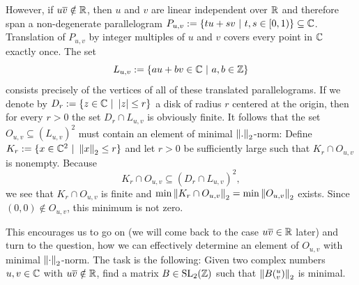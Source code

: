 However, if $u \overline{v} \notin \mathbb{R}$, then $u$ and $v$ are linear independent over $\mathbb{R}$ and therefore span a non-degenerate parallelogram $P_{u,v} := \{ t u + s v \ | \ t,s \in [0,1) \} \subseteq \mathbb{C}$. Translation of $P_{u,v}$ by integer multiples of $u$ and $v$ covers every point in $\mathbb{C}$ exactly once. The set
\begin{equation*}
L_{u,v} := \{ a u + b v \in \mathbb{C} \ | \ a,b \in \mathbb{Z} \}
\end{equation*}
consists precisely of the vertices of all of these translated parallelograms. If we denote by $D_r := \{ z \in \mathbb{C} \ | \ \left|z\right| \le r \}$ a disk of radius $r$ centered at the origin, then for every $r > 0$ the set $D_r \cap L_{u,v}$ is obviously finite. It follows that the set $O_{u,v} \subseteq (L_{u,v})^2$ must contain an element of minimal $\left\| . \right\|_2$-norm: Define $K_r := \{ x \in \mathbb{C}^2 \ | \ \left\| x \right\|_2 \le r \}$ and let $r > 0$ be sufficiently large such that $K_r \cap O_{u,v}$ is nonempty. Because 
\begin{equation}
\label{eqn_FunDomOuvFinite}
K_r \cap O_{u,v} \subseteq (D_r \cap L_{u,v})^2,
\end{equation}
we see that $K_r \cap O_{u,v}$ is finite and $\min \left\| K_r \cap O_{u,v} \right\|_2 = \min \left\| O_{u,v} \right\|_2$ exists. Since $(0,0) \notin O_{u,v}$, this minimum is not zero.

This encourages us to go on (we will come back to the case $u \overline{v} \in \mathbb{R}$ later) and turn to the question, how we can effectively determine an element of $O_{u,v}$ with minimal $\left\| \cdot \right\|_2$-norm. The task is the following: Given two complex numbers $u,v \in \mathbb{C}$ with $u \overline{v} \notin \mathbb{R}$, find a matrix $B \in \operatorname{SL}_{2}(\mathbb{Z})$ such that $\left\| B ({}^u_v) \right\|_2$ is minimal. 

